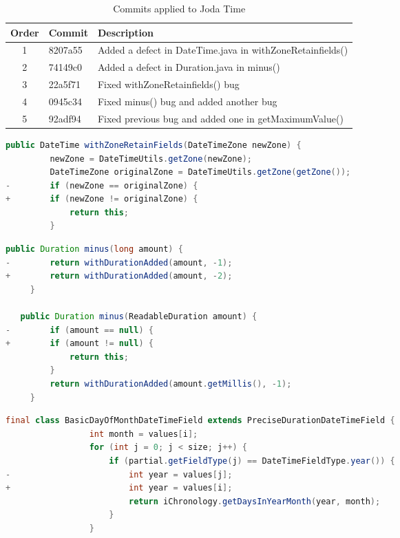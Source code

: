 \begin{table}[H]
    \centering
    \caption{Commits applied to Joda Time}
    \label{table:commits_jodatime}
    \begin{tabular}{|c|l|l|}
        \hline
        Order & Commit & Description \\ \hline
        1 & 8207a55	& Added a defect in DateTime.java in withZoneRetainfields() \\ \hline
        2 & 74149c0 & Added a defect in Duration.java in minus() \\ \hline
        3 & 22a5f71 & Fixed withZoneRetainfields() bug \\ \hline
        4 & 0945c34 & Fixed minus() bug and added another bug \\ \hline
        5 & 92adf94 & Fixed previous bug and added one in getMaximumValue() \\ \hline

    \end{tabular}
\end{table}

\begin{lstlisting}[language=java, caption=Commit 8207a55 patch]
  public DateTime withZoneRetainFields(DateTimeZone newZone) {
         newZone = DateTimeUtils.getZone(newZone);
         DateTimeZone originalZone = DateTimeUtils.getZone(getZone());
-        if (newZone == originalZone) {
+        if (newZone != originalZone) {
             return this;
         }
\end{lstlisting}

\begin{lstlisting}[language=java, caption=Commit 74149c0 patch]
 public Duration minus(long amount) {
-        return withDurationAdded(amount, -1);
+        return withDurationAdded(amount, -2);
     }

   public Duration minus(ReadableDuration amount) {
-        if (amount == null) {
+        if (amount != null) {
             return this;
         }
         return withDurationAdded(amount.getMillis(), -1);
     }
\end{lstlisting}

\begin{lstlisting}[language=java, caption=Commit 92adf94 patch]
final class BasicDayOfMonthDateTimeField extends PreciseDurationDateTimeField {
                 int month = values[i];
                 for (int j = 0; j < size; j++) {
                     if (partial.getFieldType(j) == DateTimeFieldType.year()) {
-                        int year = values[j];
+                        int year = values[i];
                         return iChronology.getDaysInYearMonth(year, month);
                     }
                 }
\end{lstlisting}

